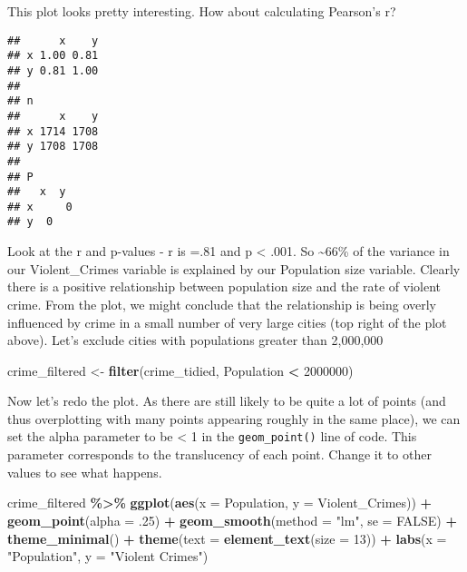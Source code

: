 \documentclass[
]{book}
\newenvironment{Shaded}{\begin{snugshade}}{\end{snugshade}}
\newcommand{\AttributeTok}[1]{\textcolor[rgb]{0.13,0.29,0.53}{#1}}
\newcommand{\ConstantTok}[1]{\textcolor[rgb]{0.56,0.35,0.01}{#1}}
\newcommand{\DecValTok}[1]{\textcolor[rgb]{0.00,0.00,0.81}{#1}}
\newcommand{\FunctionTok}[1]{\textcolor[rgb]{0.13,0.29,0.53}{\textbf{#1}}}
\newcommand{\NormalTok}[1]{#1}
\newcommand{\OtherTok}[1]{\textcolor[rgb]{0.56,0.35,0.01}{#1}}
\newcommand{\SpecialCharTok}[1]{\textcolor[rgb]{0.81,0.36,0.00}{\textbf{#1}}}
\newcommand{\StringTok}[1]{\textcolor[rgb]{0.31,0.60,0.02}{#1}}
\begin{document}
This plot looks pretty interesting. How about calculating Pearson's r?

\begin{Shaded}
\end{Shaded}

\begin{verbatim}
##      x    y
## x 1.00 0.81
## y 0.81 1.00
## 
## n
##      x    y
## x 1714 1708
## y 1708 1708
## 
## P
##   x  y 
## x     0
## y  0
\end{verbatim}

Look at the r and p-values - r is =.81 and p \textless{} .001. So \textasciitilde66\% of the variance in our Violent\_Crimes variable is explained by our Population size variable. Clearly there is a positive relationship between population size and the rate of violent crime. From the plot, we might conclude that the relationship is being overly influenced by crime in a small number of very large cities (top right of the plot above). Let's exclude cities with populations greater than 2,000,000

\begin{Shaded}
\begin{Highlighting}[]
\NormalTok{crime\_filtered }\OtherTok{\textless{}{-}} \FunctionTok{filter}\NormalTok{(crime\_tidied, Population }\SpecialCharTok{\textless{}} \DecValTok{2000000}\NormalTok{)}
\end{Highlighting}
\end{Shaded}

Now let's redo the plot. As there are still likely to be quite a lot of points (and thus overplotting with many points appearing roughly in the same place), we can set the alpha parameter to be \textless{} 1 in the \texttt{geom\_point()} line of code. This parameter corresponds to the translucency of each point. Change it to other values to see what happens.

\begin{Shaded}
\begin{Highlighting}[]
\NormalTok{crime\_filtered }\SpecialCharTok{\%\textgreater{}\%}
  \FunctionTok{ggplot}\NormalTok{(}\FunctionTok{aes}\NormalTok{(}\AttributeTok{x =}\NormalTok{ Population, }\AttributeTok{y =}\NormalTok{ Violent\_Crimes)) }\SpecialCharTok{+} 
  \FunctionTok{geom\_point}\NormalTok{(}\AttributeTok{alpha =}\NormalTok{ .}\DecValTok{25}\NormalTok{) }\SpecialCharTok{+} 
  \FunctionTok{geom\_smooth}\NormalTok{(}\AttributeTok{method =} \StringTok{"lm"}\NormalTok{, }\AttributeTok{se =} \ConstantTok{FALSE}\NormalTok{) }\SpecialCharTok{+}
  \FunctionTok{theme\_minimal}\NormalTok{() }\SpecialCharTok{+}
  \FunctionTok{theme}\NormalTok{(}\AttributeTok{text =} \FunctionTok{element\_text}\NormalTok{(}\AttributeTok{size =} \DecValTok{13}\NormalTok{)) }\SpecialCharTok{+}
  \FunctionTok{labs}\NormalTok{(}\AttributeTok{x =} \StringTok{"Population"}\NormalTok{, }
       \AttributeTok{y =} \StringTok{"Violent Crimes"}\NormalTok{)}
\end{Highlighting}
\end{Shaded}
\end{document}
